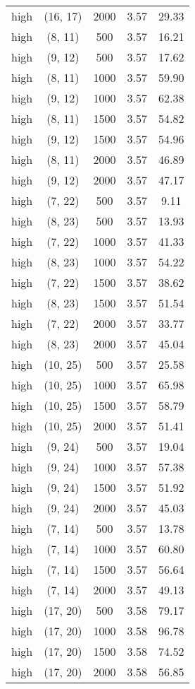 \begin{tabular}{c c c c c}
high & (16, 17) &  2000 & 3.57 & 29.33 \\
high & (8, 11) &  500 & 3.57 & 16.21 \\
high & (9, 12) &  500 & 3.57 & 17.62 \\
high & (8, 11) &  1000 & 3.57 & 59.90 \\
high & (9, 12) &  1000 & 3.57 & 62.38 \\
high & (8, 11) &  1500 & 3.57 & 54.82 \\
high & (9, 12) &  1500 & 3.57 & 54.96 \\
high & (8, 11) &  2000 & 3.57 & 46.89 \\
high & (9, 12) &  2000 & 3.57 & 47.17 \\
high & (7, 22) &  500 & 3.57 & 9.11 \\
high & (8, 23) &  500 & 3.57 & 13.93 \\
high & (7, 22) &  1000 & 3.57 & 41.33 \\
high & (8, 23) &  1000 & 3.57 & 54.22 \\
high & (7, 22) &  1500 & 3.57 & 38.62 \\
high & (8, 23) &  1500 & 3.57 & 51.54 \\
high & (7, 22) &  2000 & 3.57 & 33.77 \\
high & (8, 23) &  2000 & 3.57 & 45.04 \\
high & (10, 25) &  500 & 3.57 & 25.58 \\
high & (10, 25) &  1000 & 3.57 & 65.98 \\
high & (10, 25) &  1500 & 3.57 & 58.79 \\
high & (10, 25) &  2000 & 3.57 & 51.41 \\
high & (9, 24) &  500 & 3.57 & 19.04 \\
high & (9, 24) &  1000 & 3.57 & 57.38 \\
high & (9, 24) &  1500 & 3.57 & 51.92 \\
high & (9, 24) &  2000 & 3.57 & 45.03 \\
high & (7, 14) &  500 & 3.57 & 13.78 \\
high & (7, 14) &  1000 & 3.57 & 60.80 \\
high & (7, 14) &  1500 & 3.57 & 56.64 \\
high & (7, 14) &  2000 & 3.57 & 49.13 \\
high & (17, 20) &  500 & 3.58 & 79.17 \\
high & (17, 20) &  1000 & 3.58 & 96.78 \\
high & (17, 20) &  1500 & 3.58 & 74.52 \\
high & (17, 20) &  2000 & 3.58 & 56.85 \\

\end{tabular}
